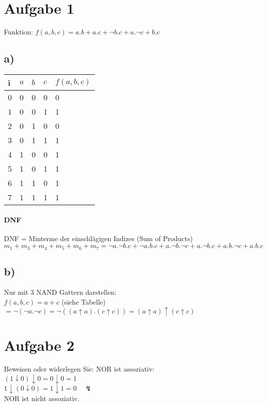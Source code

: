 \section{Aufgabe 1}
Funktion:
$f(a,b,c)=a.b + a.c + \neg b.c + a.\neg c + b.c$\\
\subsection{a)}
\begin{tabular}{|l||l|l|l||l|}\hline
i & $a$ & $b$ & $c$ & $f(a,b,c)$ \\\hline\hline
0 & 0 & 0 & 0 & 0 \\\hline
1 & 0 & 0 & 1 & 1 \\\hline
2 & 0 & 1 & 0 & 0 \\\hline
3 & 0 & 1 & 1 & 1 \\\hline
4 & 1 & 0 & 0 & 1 \\\hline
5 & 1 & 0 & 1 & 1 \\\hline
6 & 1 & 1 & 0 & 1 \\\hline
7 & 1 & 1 & 1 & 1 \\\hline
\end{tabular} 

\paragraph{DNF}
DNF = Minterme der einschlägigen Indizes (Sum of Products)\\
$m_1 + m_3 + m_4 + m_5 + m_6 + m_7 = \neg a.\neg b.c + \neg a.b.c + a.\neg b.\neg c + a.\neg b.c + a.b.\neg c + a.b.c$

\subsection{b)}
Nur mit 3 NAND Gattern darstellen:\\
$f(a,b,c) = a + c$ (siehe Tabelle)\\
$= \neg(\neg a.\neg c) = \neg((a\uparrow a).(c\uparrow c)) = (a\uparrow a) \uparrow (c\uparrow c)$

\section{Aufgabe 2}
Beweisen oder widerlegen Sie: NOR ist assoziativ:\\
$(1 \downarrow 0) \downarrow 0 = 0 \downarrow 0 = 1$\\
$1 \downarrow (0 \downarrow 0) = 1 \downarrow 1 = 0 \quad \lightning$\\
NOR ist nicht assoziativ.

